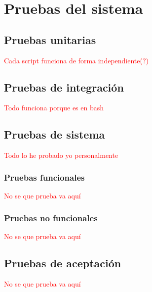 \chapter{Pruebas del sistema}
\section{Pruebas unitarias}
\textcolor{red}{Cada script funciona de forma independiente(?)}

\section{Pruebas de integración}
\textcolor{red}{Todo funciona porque es en bash}

\section{Pruebas de sistema}
\textcolor{red}{Todo lo he probado yo personalmente}

\subsection{Pruebas funcionales}
\textcolor{red}{No se que prueba va aquí}

\subsection{Pruebas no funcionales}
\textcolor{red}{No se que prueba va aquí}

\section{Pruebas de aceptación}
\textcolor{red}{No se que prueba va aquí}